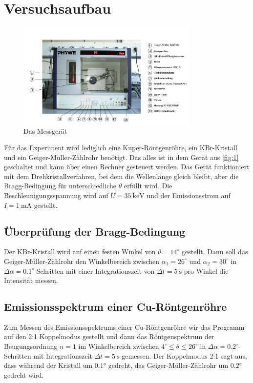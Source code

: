 \section{Versuchsaufbau}
\begin{figure}[H]
\centering
  \includegraphics[width=9cm]{content/1.png}
  \caption{Das Messgerät}
  \label{fig:1}
\end{figure}
Für das Experiment wird lediglich eine Kuper-Röntgenröhre, ein KBr-Kristall und ein Geiger-Müller-Zählrohr benötigt. Das alles ist in dem Gerät aus \autoref{fig:1} geschaltet und kann über einen Rechner gesteuert werden. Das Gerät funktioniert mit dem Drehkristallverfahren, bei dem die Wellenlänge gleich bleibt, aber die Bragg-Bedingung für unterschiedliche $\theta$ erfüllt wird. Die Beschleunigungsspannung wird auf $U=35\ \si{\keV}$ und der Emissionsstrom auf $I=1\ \si{\mA}$ gestellt.

\subsection{Überprüfung der Bragg-Bedingung}
Der KBr-Kristall wird auf einen festen Winkel von $\theta=14^{\circ}$ gestellt. Dann soll das Geiger-Müller-Zählrohr den Winkelbereich zwischen $\alpha_{1}=26^{\circ}$ und $\alpha_{2}=30^{\circ}$ in $\Delta\alpha=0.1^{\circ}$-Schritten mit einer Integrationszeit von $\Delta t=5\ \si{\s}$ pro Winkel die Intensität messen.

\subsection{Emissionsspektrum einer Cu-Röntgenröhre}
Zum Messen des Emissionsspektrums einer Cu-Röntgenröhre wir das Programm auf den 2:1 Koppelmodus gestellt und dann das Röntgenspektrum der Beugungsordnung $n=1$ im Winkelbereich zwischen $4^{\circ}\leq\theta\leq 26^{\circ}$ in $\Delta\alpha=0.2^{\circ}$-Schritten mit Integrationszeit $\Delta t=5\ \si{\s}$ gemessen. Der Koppelmodus 2:1 sagt aus, dass während der Kristall um $0.1$° gedreht, das Geiger-Müller-Zählrohr um $0.2$° gedreht wird. 

